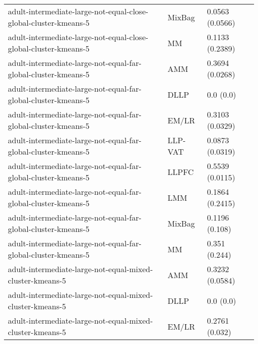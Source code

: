 \begin{longtable}{lll}
                                             adult-intermediate-large-not-equal-close-global-cluster-kmeans-5 &    MixBag &                       0.0563 (0.0566) \\
                                             adult-intermediate-large-not-equal-close-global-cluster-kmeans-5 &        MM &                       0.1133 (0.2389) \\
                                               adult-intermediate-large-not-equal-far-global-cluster-kmeans-5 &       AMM &                       0.3694 (0.0268) \\
                                               adult-intermediate-large-not-equal-far-global-cluster-kmeans-5 &      DLLP &                             0.0 (0.0) \\
                                               adult-intermediate-large-not-equal-far-global-cluster-kmeans-5 &     EM/LR &                       0.3103 (0.0329) \\
                                               adult-intermediate-large-not-equal-far-global-cluster-kmeans-5 &   LLP-VAT &                       0.0873 (0.0319) \\
                                               adult-intermediate-large-not-equal-far-global-cluster-kmeans-5 &     LLPFC &                       0.5539 (0.0115) \\
                                               adult-intermediate-large-not-equal-far-global-cluster-kmeans-5 &       LMM &                       0.1864 (0.2415) \\
                                               adult-intermediate-large-not-equal-far-global-cluster-kmeans-5 &    MixBag &                        0.1196 (0.108) \\
                                               adult-intermediate-large-not-equal-far-global-cluster-kmeans-5 &        MM &                         0.351 (0.244) \\
                                                    adult-intermediate-large-not-equal-mixed-cluster-kmeans-5 &       AMM &                       0.3232 (0.0584) \\
                                                    adult-intermediate-large-not-equal-mixed-cluster-kmeans-5 &      DLLP &                             0.0 (0.0) \\
                                                    adult-intermediate-large-not-equal-mixed-cluster-kmeans-5 &     EM/LR &                        0.2761 (0.032) \\

\end{longtable}

